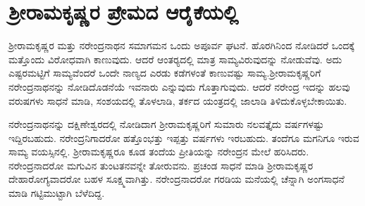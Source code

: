 
\chapter{ಶ‍್ರೀರಾಮಕೃಷ್ಣರ ಪ್ರೇಮದ ಆರೈಕೆಯಲ್ಲಿ}

ಶ‍್ರೀರಾಮಕೃಷ್ಣರ ಮತ್ತು ನರೇಂದ್ರನಾಥನ ಸಮಾಗಮನ ಒಂದು ಅಪೂರ್ವ ಘಟನೆ. ಹೊರಗಿನಿಂದ ನೋಡಿದರೆ ಒಂದಕ್ಕೆ ಮತ್ತೊಂದು ವಿರೋಧವಾಗಿ ಕಾಣುವುದು. ಆದರೆ ಆಂತರ‍್ಯದಲ್ಲಿ ಮಾತ್ರ ಸಾಮ್ಯವಿರುವುದನ್ನು ನೋಡುವೆವು. ಅದು ಎಷ್ಟರಮಟ್ಟಿಗೆ ಸಾಮ್ಯವೆಂದರೆ ಒಂದೇ ನಾಣ್ಯದ ಎರಡು ಕಡೆಗಳಂತೆ ಕಾಣುವಷ್ಟು ಸಾಮ್ಯ.\break ಶ‍್ರೀರಾಮಕೃಷ್ಣರಿಗೆ ನರೇಂದ್ರನಾಥನನ್ನು ನೋಡಿದೊಡನೆಯೆ ಇವನಾರು ಎನ್ನುವುದು ಗೊತ್ತಾಗುವುದು. ಆದರೆ ನರೇಂದ್ರ ಇದನ್ನು ಹಲವು ವರುಷಗಳು ಸಾಧನೆ ಮಾಡಿ, ಸಂಶಯದಲ್ಲಿ ತೊಳಲಾಡಿ, ತರ್ಕದ ಯಂತ್ರದಲ್ಲಿ ಜಾಲಾಡಿ ತಿಳಿದುಕೊಳ್ಳಬೇಕಾಯಿತು.

ನರೇಂದ್ರನಾಥನನ್ನು ದಕ್ಷಿಣೇಶ್ವರದಲ್ಲಿ ನೋಡಿದಾಗ ಶ‍್ರೀರಾಮಕೃಷ್ಣರಿಗೆ ಸುಮಾರು ನಲವತ್ತೈದು ವರ್ಷಗಳಷ್ಟು ಇದ್ದಿರಬಹುದು. ನರೇಂದ್ರನಿಗಾದರೋ ಹತ್ತೊಂಭತ್ತು ಇಪ್ಪತ್ತು ವರ್ಷಗಳು ಇರಬಹುದು. ತಂದೆಗೂ ಮಗನಿಗೂ ಇರುವ ಸಾಮ್ಯ ವಯಸ್ಸಿನಲ್ಲಿ. ಶ‍್ರೀರಾಮಕೃಷ್ಣರೂ ಕೂಡ ತಂದೆಯ ಪ್ರೀತಿಯನ್ನು ನರೇಂದ್ರನ ಮೇಲೆ ಹರಿಸಿದರು. ನರೇಂದ್ರನಾದರೋ ಮಗುವಿನ ತುಂಟತನವನ್ನೇ ತೋರುವನು. ಪ್ರಚಂಡ ಸಾಧನೆ ಮಾಡಿ ಶ‍್ರೀರಾಮಕೃಷ್ಣರ ದೇಹಾರೋಗ್ಯವಾದರೋ ಬಹಳ ಸೂಕ್ಷ್ಮವಾಗಿತ್ತು. ನರೇಂದ್ರನಾದರೋ ಗರಡಿಯ ಮನೆಯಲ್ಲಿ ಚೆನ್ನಾಗಿ ಅಂಗಸಾಧನೆ ಮಾಡಿ ಗಟ್ಟಿಮುಟ್ಟಾಗಿ ಬೆಳೆದಿದ್ದ.

